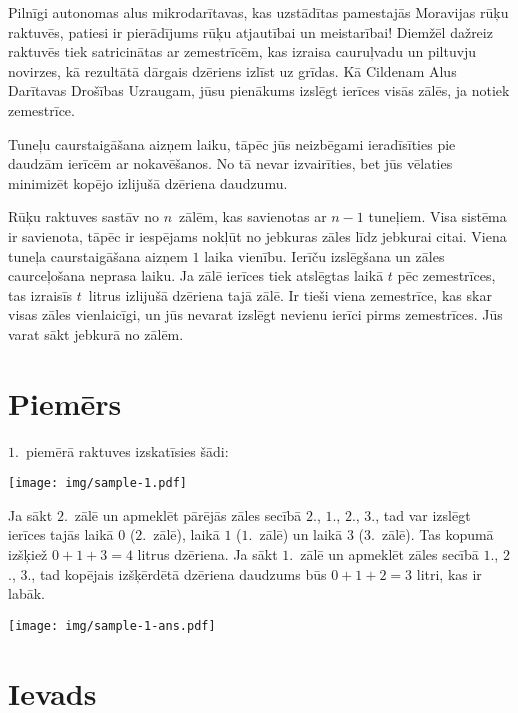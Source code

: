
\noindent

Pilnīgi autonomas alus mikrodarītavas, kas uzstādītas pamestajās Moravijas rūķu raktuvēs, patiesi ir pierādījums rūķu atjautībai un meistarībai!
Diemžēl dažreiz raktuvēs tiek satricinātas ar zemestrīcēm, kas izraisa cauruļvadu un piltuvju novirzes, kā rezultātā dārgais dzēriens izlīst uz grīdas.
Kā Cildenam Alus Darītavas Drošības Uzraugam, jūsu pienākums izslēgt ierīces visās zālēs, ja notiek zemestrīce.

Tuneļu caurstaigāšana aizņem laiku, tāpēc jūs neizbēgami ieradīsīties pie daudzām ierīcēm ar nokavēšanos.
No tā nevar izvairīties, bet jūs vēlaties minimizēt kopējo izlijušā dzēriena daudzumu.

\medskip
Rūķu raktuves sastāv no $n$~zālēm, kas savienotas ar $n-1$ tuneļiem.
Visa sistēma ir savienota, tāpēc ir iespējams nokļūt no jebkuras zāles līdz jebkurai citai.
Viena tuneļa caurstaigāšana aizņem $1$ laika vienību.
Ierīču izslēgšana un zāles caurceļošana neprasa laiku.
Ja zālē ierīces tiek atslēgtas laikā $t$ pēc zemestrīces, tas izraisīs $t$~litrus izlijušā dzēriena tajā zālē.
Ir tieši viena zemestrīce, kas skar visas zāles vienlaicīgi, un jūs nevarat izslēgt nevienu ierīci pirms zemestrīces.
Jūs varat sākt jebkurā no zālēm.

\section*{Piemērs}

$1$.~piemērā raktuves izskatīsies šādi:

\texttt{[image: img/sample-1.pdf]}

Ja sākt $2$.~zālē un apmeklēt pārējās zāles secībā $2$., $1$., $2$., $3$., tad var izslēgt ierīces tajās laikā $0$ ($2$.~zālē), laikā $1$ ($1$.~zālē) un laikā $3$ ($3$.~zālē).
Tas kopumā izšķiež $0+1+3=4$ litrus dzēriena.
Ja sākt $1$.~zālē un apmeklēt zāles secībā $1$., $2$., $3$., tad kopējais izšķērdētā dzēriena daudzums būs $0+1+2=3$ litri, kas ir labāk.

\texttt{[image: img/sample-1-ans.pdf]}

\section*{Ievads}

